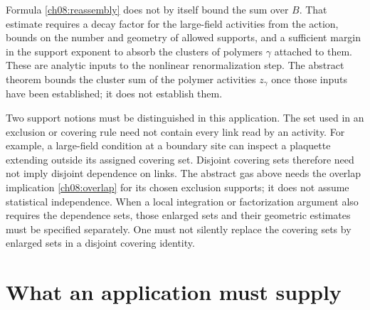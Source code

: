 Formula \eqref{ch08:reassembly} does not by itself bound the sum over
$B$. That estimate requires a decay factor for the large-field activities from the
action, bounds on the number and geometry of allowed supports, and a sufficient
margin in the support exponent to absorb the clusters of polymers $\gamma$ attached to them.
These are analytic inputs to the nonlinear renormalization step. The
abstract theorem bounds the cluster sum of the polymer activities $z_\gamma$ once those inputs have
been established; it does not establish them.

Two support notions must be distinguished in this application. The set
used in an exclusion or covering rule need not contain every link read
by an activity. For example, a large-field condition at a boundary site can
inspect a plaquette extending outside its assigned covering set. Disjoint
covering sets therefore need not imply disjoint dependence on links.
The abstract gas above needs the overlap implication
\eqref{ch08:overlap} for its chosen exclusion supports; it does not assume
statistical independence. When a local integration or factorization
argument also requires the dependence sets, those enlarged sets
and their geometric estimates must be specified separately. One must not
silently replace the covering sets by enlarged sets in a disjoint covering
identity.

\section{What an application must supply}
\label{ch08:application}

